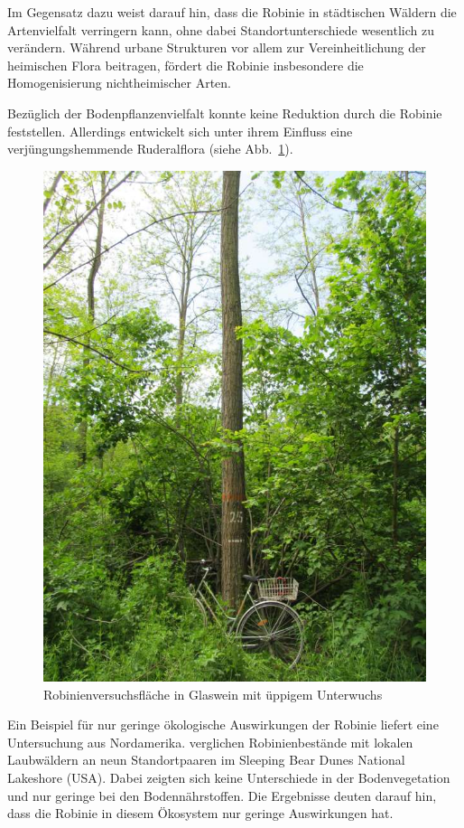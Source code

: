 \documentclass[twocolumn]{scrartcl}
\begin{document}
Im Gegensatz dazu weist \citet{trentanovi2013robinie} darauf hin, dass
die Robinie in städtischen Wäldern die Artenvielfalt verringern kann,
ohne dabei Standortunterschiede wesentlich zu verändern. Während
urbane Strukturen vor allem zur Vereinheitlichung der heimischen Flora
beitragen, fördert die Robinie insbesondere die Homogenisierung
nichtheimischer Arten.

Bezüglich der Bodenpflanzenvielfalt konnte \citet{sitzia2012robinie}
keine Reduktion durch die Robinie feststellen. Allerdings entwickelt
sich unter ihrem Einfluss eine verjüngungshemmende Ruderalflora (siehe
Abb.~\ref{fig:glaswein}).

\begin{figure}[htbp]
  \centering
  \includegraphics[width=.9\linewidth]{./bild/GlasweinRobinie2023a}
  \caption{Robinienversuchsfläche in Glaswein mit üppigem Unterwuchs}
  \label{fig:glaswein}
\end{figure}

Ein Beispiel für nur geringe ökologische Auswirkungen der Robinie
liefert eine Untersuchung aus Nordamerika. \citet{deneau2013robinie}
verglichen Robinienbestände mit lokalen Laubwäldern an neun
Standortpaaren im Sleeping Bear Dunes National Lakeshore (USA). Dabei
zeigten sich keine Unterschiede in der Bodenvegetation und nur geringe
bei den Bodennährstoffen. Die Ergebnisse deuten darauf hin, dass die
Robinie in diesem Ökosystem nur geringe Auswirkungen hat.
\end{document}
